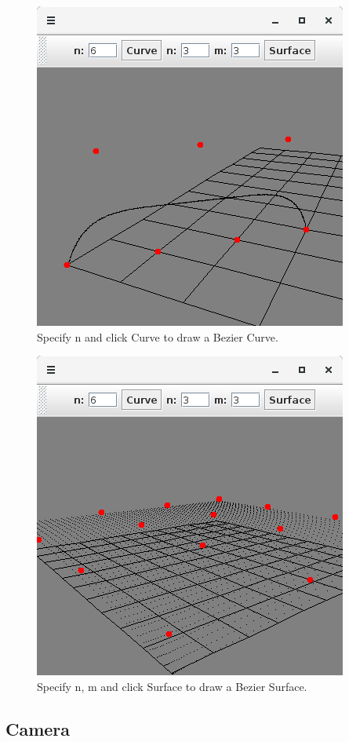 \documentclass{article}
\begin{document}
\begin{figure}[!htb]
  \caption{Specify n and click Curve to draw a Bezier Curve.}
  \centering
  \includegraphics[scale=0.38]{images/image3.png}
\end{figure}

\begin{figure}[!htb]
  \caption{Specify n, m and click Surface to draw a Bezier Surface.}
  \centering
  \includegraphics[scale=0.38]{images/image4.png}
\end{figure}

\subsection{Camera}
\end{document}
